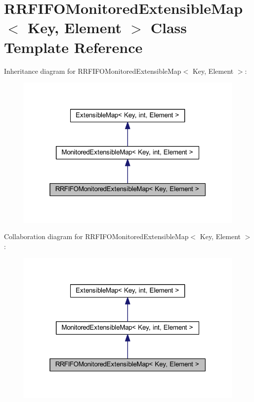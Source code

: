 \hypertarget{class_r_r_f_i_f_o_monitored_extensible_map}{
\section{RRFIFOMonitoredExtensibleMap$<$ Key, Element $>$ Class Template Reference}
\label{class_r_r_f_i_f_o_monitored_extensible_map}
}


Inheritance diagram for RRFIFOMonitoredExtensibleMap$<$ Key, Element $>$:\nopagebreak
\begin{figure}[H]
\begin{center}
\leavevmode
\includegraphics[width=316pt]{class_r_r_f_i_f_o_monitored_extensible_map__inherit__graph}
\end{center}
\end{figure}


Collaboration diagram for RRFIFOMonitoredExtensibleMap$<$ Key, Element $>$:\nopagebreak
\begin{figure}[H]
\begin{center}
\leavevmode
\includegraphics[width=316pt]{class_r_r_f_i_f_o_monitored_extensible_map__coll__graph}
\end{center}
\end{figure}
